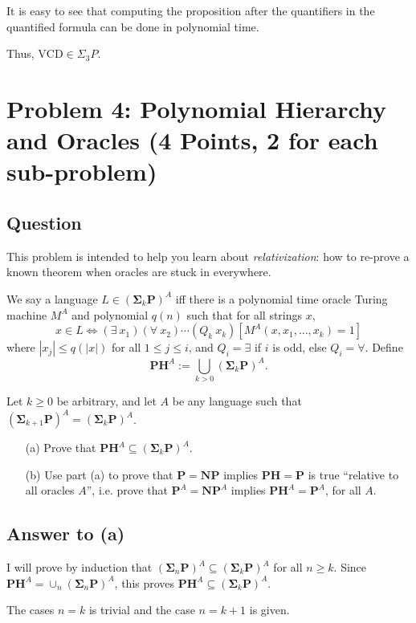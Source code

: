 \documentclass{article}
\renewcommand{\P}{\mathbf{P}}
\newcommand{\NP}{\mathbf{NP}}
\newcommand{\PH}{\mathbf{PH}}
\newcommand{\BSigma}{\mathbf{\Sigma}}
\begin{document}
It is easy to see that computing the proposition after the quantifiers in the quantified formula can be done in polynomial time.

Thus, $\text{VCD} \in \Sigma_3 P$.
   
\section*{Problem 4: Polynomial Hierarchy and Oracles (4 Points, 2 for each sub-problem)}

\subsection*{Question}
This problem is intended to help you learn about \emph{relativization}: how to re-prove a known theorem when oracles are stuck in everywhere.

We say a language $L\in (\mathbf{\Sigma}_k \P)^A$ iff there is a polynomial time oracle Turing machine $M^A$ and polynomial $q(n)$ such that for all strings $x$,
	\[
		x\in L \Leftrightarrow (\exists~ x_1)(\forall~ x_2)\cdots (Q_k~ x_k) [M^A(x,x_1,\ldots,x_k)=1]
	\] where $|x_j| \leq q(|x|)$ for all $1\leq j\leq i$, and $Q_i = \exists$ if $i$ is odd, else $Q_i = \forall$. Define \[\PH^A := \bigcup_{k>0} (\mathbf{\Sigma}_k \P)^A.\] 

Let $k \geq 0$ be arbitrary, and let $A$ be any language such that $(\mathbf{\Sigma}_{k+1} \P)^A=(\mathbf{\Sigma}_k \P)^A$. \\

\begin{enumerate}

\item[(a)] Prove that $\PH^A\subseteq (\mathbf{\Sigma}_k \P)^A$. 
\item[(b)] Use part (a) to prove that $\P = \NP$ implies $\PH = \P$ is true ``relative to all oracles $A$'', i.e. prove that $\P^A = \NP^A$ implies $\PH^A = \P^A$, for all $A$.
\end{enumerate}

\subsection*{Answer to (a)}

I will prove by induction that $(\BSigma_n \P)^A \subseteq (\BSigma_k \P)^A$ for all $n \geq k$.  Since $\PH^A = \cup_n (\BSigma_n \P)^A$, this proves $\PH^A \subseteq (\BSigma_k \P)^A$.

The cases $n = k$ is trivial and the case $n = k + 1$ is given.
\end{document}
